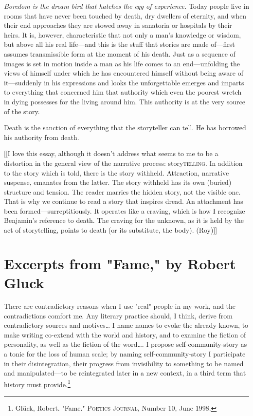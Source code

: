 \documentclass[
]{memoir}
\begin{document}
\emph{Boredom is the dream bird that hatches the egg of experience.}
Today people live in rooms that have never been touched by death, dry
dwellers of eternity, and when their end approaches they are stowed away
in sanatoria or hospitals by their heirs. It is, however, characteristic
that not only a man's knowledge or wisdom, but above all his real
life---and this is the stuff that stories are made of---first assumes
transmissible form at the moment of his death. Just as a sequence of
images is set in motion inside a man as his life comes to an
end---unfolding the views of himself under which he has encountered
himself without being aware of it---suddenly in his expressions and
looks the unforgettable emerges and imparts to everything that concerned
him that authority which even the poorest wretch in dying possesses for
the living around him. This authority is at the very source of the
story.

Death is the sanction of everything that the storyteller can tell. He
has borrowed his authority from death.

{[}{[}I love this essay, although it doesn't address what seems to me to
be a distortion in the general view of the narrative process:
story\textsc{telling}. In addition to the story which is told, there is
the story withheld. Attraction, narrative suspense, emanates from the
latter. The story withheld has its own (buried) structure and tension.
The reader marries the hidden story, not the visible one. That is why we
continue to read a story that inspires dread. An attachment has been
formed---surreptitiously. It operates like a craving, which is how I
recognize Benjamin's reference to death. The craving for the unknown, as
it is held by the act of storytelling, points to death (or its
substitute, the body). (Roy){]}{]}

\hypertarget{excerpts-from-fame-by-robert-gluck}{%
\section*{Excerpts from "Fame," by Robert
Gluck}\label{excerpts-from-fame-by-robert-gluck}}

There are contradictory reasons when I use "real" people in my work, and
the contradictions comfort me. Any literary practice should, I think,
derive from contradictory sources and motives\ldots{} I name names to
evoke the already-known, to make writing co-extend with the world and
history, and to examine the fiction of personality, as well as the
fiction of the word\ldots{}. I propose self-community-story as a tonic
for the loss of human scale; by naming self-community-story I
participate in their disintegration, their progress from invisibility to
something to be named and manipulated---to be reintegrated later in a
new context, in a third term that history must provide.\footnote{Glück,
  Robert. "Fame." \textsc{Poetics Journal}, Number 10, June 1998.}
\end{document}
